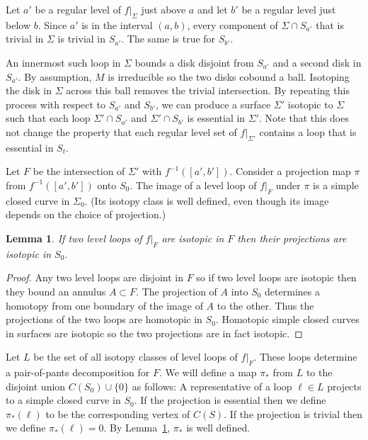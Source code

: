 \documentclass[12pt]{amsart}
\theoremstyle{plain}
\newtheorem{Lem}[Thm]{Lemma}
\theoremstyle{definition}
\begin{document}
Let $a'$ be a regular level of $f|_{\Sigma}$ just above $a$ and let $b'$ be a regular level just below $b$.  Since $a'$ is in the interval $(a,b)$, every component of $\Sigma \cap S_{a'}$ that is trivial in $\Sigma$ is trivial in $S_{a'}$.  The same is true for $S_{b'}$.

An innermost such loop in $\Sigma$ bounds a disk disjoint from $S_{a'}$ and a second disk in $S_{a'}$.  By assumption, $M$ is irreducible so the two disks cobound a ball.  Isotoping the disk in $\Sigma$ across this ball removes the trivial intersection.  By repeating this process with respect to $S_{a'}$ and $S_{b'}$, we can produce a surface $\Sigma'$ isotopic to $\Sigma$ such that each loop $\Sigma' \cap S_{a'}$ and $\Sigma' \cap S_{b'}$ is essential in $\Sigma'$.  Note that this does not change the property that each regular level set of $f|_{\Sigma'}$ contains a loop that is essential in $S_t$.

Let $F$ be the intersection of $\Sigma'$ with $f^{-1}([a',b'])$.  Consider a projection map $\pi$ from $f^{-1}([a',b'])$ onto $S_0$.  The image of a level loop of $f|_{F}$ under $\pi$ is a simple closed curve in $\Sigma_0$.  (Its isotopy class is well defined, even though its image depends on the choice of projection.)

\begin{Lem}
\label{parallelparallellem}
If two level loops of $f|_{F}$ are isotopic in $F$ then their projections are isotopic in $S_0$.
\end{Lem}

\begin{proof}
Any two level loops are disjoint in $F$ so if two level loops are isotopic then they bound an annulus $A \subset F$.  The projection of $A$ into $S_0$ determines a homotopy from one boundary of the image of $A$ to the other.  Thus the projections of the two loops are homotopic in $S_0$.  Homotopic simple closed curves in surfaces are isotopic so the two projections are in fact isotopic.
\end{proof}

Let $L$ be the set of all isotopy classes of level loops of $f|_F$.  These loops determine a pair-of-pants decomposition for $F$.  We will define a map $\pi_*$ from $L$ to the disjoint union $C(S_0) \cup \{0\}$ as follows:  A representative of a loop $\ell \in L$ projects to a simple closed curve in $S_0$.  If the projection is essential then we define $\pi_*(\ell)$ to be the corresponding vertex of $C(S)$.  If the projection is trivial then we define $\pi_*(\ell) = 0$.  By Lemma~\ref{parallelparallellem}, $\pi_*$ is well defined.  
\end{document}
